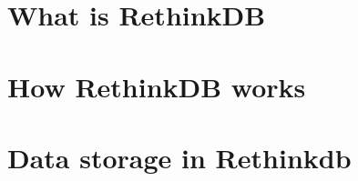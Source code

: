 \section{What is RethinkDB}

\section{How RethinkDB works}

\section{Data storage in Rethinkdb}

\section{}